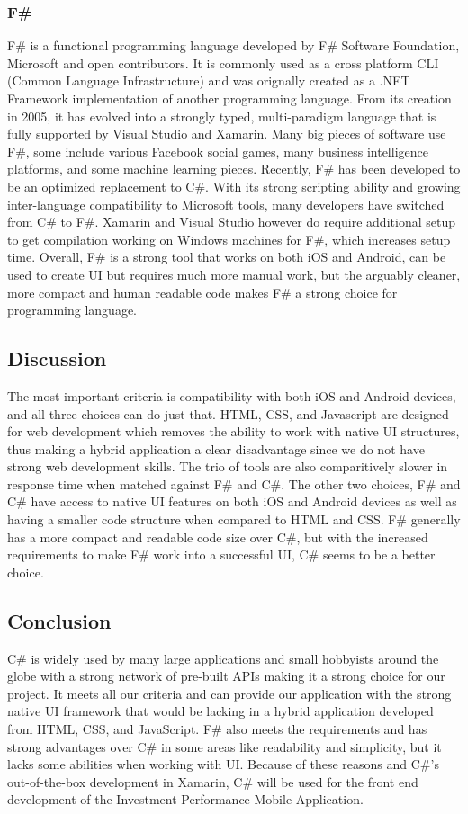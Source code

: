 \documentclass[onecolumn, draftclsnofoot,10pt, compsoc]{IEEEtran}
\begin{document}
\begin{singlespace}
\subsubsection{F\#}
F\# is a functional programming language developed by F\# Software Foundation, Microsoft and open contributors. It is commonly used as a cross platform CLI (Common Language Infrastructure) and was orignally
created as a .NET Framework implementation of another programming language. From its creation in 2005, it has evolved into a strongly typed, multi-paradigm language that is fully supported by Visual Studio and Xamarin.
Many big pieces of software use F\#, some include various Facebook social games, many business intelligence platforms, and some machine learning pieces. Recently, F\# has been developed to be an optimized
replacement to C\#. With its strong scripting ability and growing inter-language compatibility to Microsoft tools, many developers have switched from C\# to F\#. Xamarin and Visual Studio however do require 
additional setup to get compilation working on Windows machines for F\#, which increases setup time. Overall, F\# is a strong tool that works on both iOS and Android, can be used to create UI but requires much more manual
work, but the arguably cleaner, more compact and human readable code makes F\# a strong choice for programming language.

\subsection{Discussion}
The most important criteria is compatibility with both iOS and Android devices, and all three choices can do just that. HTML, CSS, and Javascript are designed for web development which removes the ability
to work with native UI structures, thus making a hybrid application a clear disadvantage since we do not have strong web development skills. The trio of tools are also comparitively slower in response time
when matched against F\# and C\#. The other two choices, F\# and C\# have access to native UI features on both iOS and Android devices as well as having a smaller code structure when compared to HTML and CSS.
F\# generally has a more compact and readable code size over C\#, but with the increased requirements to make F\# work into a successful UI, C\# seems to be a better choice. 

\subsection{Conclusion}
C\# is widely used by many large applications and small hobbyists around the globe with a strong network of pre-built APIs making it a strong choice for our project. It meets all our criteria and can provide our
application with the strong native UI framework that would be lacking in a hybrid application developed from HTML, CSS, and JavaScript. F\# also meets the requirements and has strong advantages over C\# in some areas
like readability and simplicity, but it lacks some abilities when working with UI. Because of these reasons and C\#'s out-of-the-box development in Xamarin, C\# will be used for the front end development of the
Investment Performance Mobile Application.


\end{singlespace}
\end{document}
